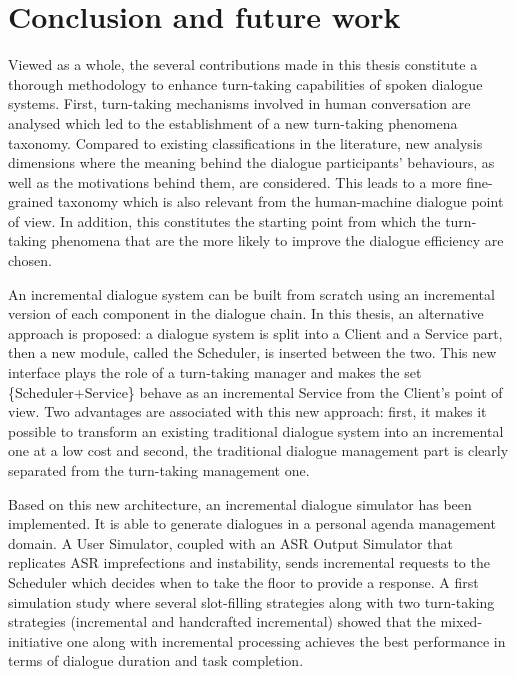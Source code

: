 \chapter*{Conclusion and future work}

	Viewed as a whole, the several contributions made in this thesis constitute a thorough methodology to enhance turn-taking capabilities of spoken dialogue systems. First, turn-taking mechanisms involved in human conversation are analysed which led to the establishment of a new turn-taking phenomena taxonomy. Compared to existing classifications in the literature, new analysis dimensions where the meaning behind the dialogue participants' behaviours, as well as the motivations behind them, are considered. This leads to a more fine-grained taxonomy which is also relevant from the human-machine dialogue point of view. In addition, this constitutes the starting point from which the turn-taking phenomena that are the more likely to improve the dialogue efficiency are chosen.

        An incremental dialogue system can be built from scratch using an incremental version of each component in the dialogue chain. In this thesis, an alternative approach is proposed: a dialogue system is split into a Client and a Service part, then a new module, called the Scheduler, is inserted between the two. This new interface plays the role of a turn-taking manager and makes the set \{Scheduler+Service\} behave as an incremental Service from the Client's point of view. Two advantages are associated with this new approach: first, it makes it possible to transform an existing traditional dialogue system into an incremental one at a low cost and second, the traditional dialogue management part is clearly separated from the turn-taking management one.

        Based on this new architecture, an incremental dialogue simulator has been implemented. It is able to generate dialogues in a personal agenda management domain. A User Simulator, coupled with an ASR Output Simulator that replicates ASR imprefections and instability, sends incremental requests to the Scheduler which decides when to take the floor to provide a response. A first simulation study where several slot-filling strategies along with two turn-taking strategies (incremental and handcrafted incremental) showed that the mixed-initiative one along with incremental processing achieves the best performance in terms of dialogue duration and task completion.

